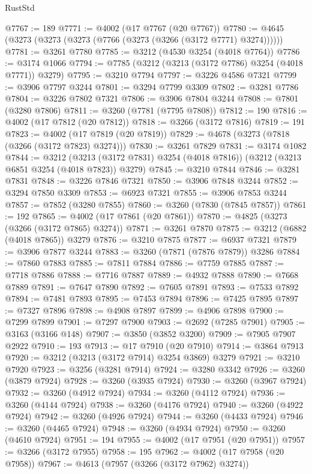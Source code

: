 \begin{lexlean}{RustStd}
\begin{coremodule}
@7767 := 189
@7771 := @4002 (@17 @7767 (@20 @7767))
@7780 := @4645 (@3273 (@3273 (@3273 (@7766 (@3273 (@3266 (@3172 @7771) @3274))))))
@7781 := @3261 @7780
@7785 := @3212 (@4530 @3254 (@4018 @7764))
@7786 := @3174 @1066
@7794 := @7785 (@3212 (@3213 (@3172 @7786) @3254 (@4018 @7771)) @3279)
@7795 := @3210 @7794
@7797 := @3226 @4586 @7321
@7799 := @3906 @7797 @3244
@7801 := @3294 @7799 @3309
@7802 := @3281 @7786
@7804 := @3226 @7802 @7321
@7806 := @3906 @7804 @3244
@7808 := @7801 (@3280 @7806)
@7811 := @3260 (@7781 (@7795 @7808))
@7812 := 190
@7816 := @4002 (@17 @7812 (@20 @7812))
@7818 := @3266 (@3172 @7816)
@7819 := 191
@7823 := @4002 (@17 @7819 (@20 @7819))
@7829 := @4678 (@3273 (@7818 (@3266 (@3172 @7823) @3274)))
@7830 := @3261 @7829
@7831 := @3174 @1082
@7844 := @3212
    (@3213 (@3172 @7831) @3254 (@4018 @7816))
    (@3212 (@3213 @6851 @3254 (@4018 @7823)) @3279)
@7845 := @3210 @7844
@7846 := @3281 @7831
@7848 := @3226 @7846 @7321
@7850 := @3906 @7848 @3244
@7852 := @3294 @7850 @3309
@7853 := @6923 @7321
@7855 := @3906 @7853 @3244
@7857 := @7852 (@3280 @7855)
@7860 := @3260 (@7830 (@7845 @7857))
@7861 := 192
@7865 := @4002 (@17 @7861 (@20 @7861))
@7870 := @4825 (@3273 (@3266 (@3172 @7865) @3274))
@7871 := @3261 @7870
@7875 := @3212 (@6882 (@4018 @7865)) @3279
@7876 := @3210 @7875
@7877 := @6937 @7321
@7879 := @3906 @7877 @3244
@7883 := @3260 (@7871 (@7876 @7879)) @3286
@7884 := @7860 @7883
@7885 := @7811 @7884
@7886 := @7759 @7885
@7887 := @7718 @7886
@7888 := @7716 @7887
@7889 := @4932 @7888
@7890 := @7668 @7889
@7891 := @7647 @7890
@7892 := @7605 @7891
@7893 := @7533 @7892
@7894 := @7481 @7893
@7895 := @7453 @7894
@7896 := @7425 @7895
@7897 := @7327 @7896
@7898 := @4908 @7897
@7899 := @4906 @7898
@7900 := @7299 @7899
@7901 := @7297 @7900
@7903 := @2692 (@7285 @7901)
@7905 := @3163 (@3166 @148)
@7907 := @3850 (@3852 @3200)
@7909 := @7905 @7907 @2922
@7910 := 193
@7913 := @17 @7910 (@20 @7910)
@7914 := @3864 @7913
@7920 := @3212 (@3213 (@3172 @7914) @3254 @3869) @3279
@7921 := @3210 @7920
@7923 := @3256 (@3281 @7914)
@7924 := @3280 @3342
@7926 := @3260 (@3879 @7924)
@7928 := @3260 (@3935 @7924)
@7930 := @3260 (@3967 @7924)
@7932 := @3260 (@4912 @7924)
@7934 := @3260 (@4112 @7924)
@7936 := @3260 (@4144 @7924)
@7938 := @3260 (@4176 @7924)
@7940 := @3260 (@4922 @7924)
@7942 := @3260 (@4926 @7924)
@7944 := @3260 (@4433 @7924)
@7946 := @3260 (@4465 @7924)
@7948 := @3260 (@4934 @7924)
@7950 := @3260 (@4610 @7924)
@7951 := 194
@7955 := @4002 (@17 @7951 (@20 @7951))
@7957 := @3266 (@3172 @7955)
@7958 := 195
@7962 := @4002 (@17 @7958 (@20 @7958))
@7967 := @4613 (@7957 (@3266 (@3172 @7962) @3274))

\end{coremodule}
\end{lexlean}
